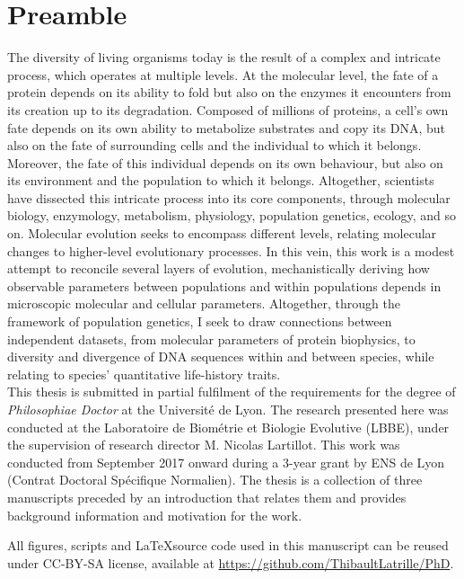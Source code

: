 \chapter*{Preamble}
The diversity of living organisms today is the result of a complex and intricate process, which operates at multiple levels.
At the molecular level, the fate of a protein depends on its ability to fold but also on the enzymes it encounters from its creation up to its degradation.
Composed of millions of proteins, a cell's own fate depends on its own ability to metabolize substrates and copy its \acrshort{DNA}, but also on the fate of surrounding cells and the individual to which it belongs.
Moreover, the fate of this individual depends on its own behaviour, but also on its environment and the population to which it belongs.
Altogether, scientists have dissected this intricate process into its core components, through molecular biology, enzymology, metabolism, physiology, population genetics, ecology, and so on.
Molecular evolution seeks to encompass different levels, relating molecular changes to higher-level evolutionary processes.
In this vein, this work is a modest attempt to reconcile several layers of evolution, mechanistically deriving how observable parameters between populations and within populations depends in microscopic molecular and cellular parameters.
Altogether, through the framework of population genetics, I seek to draw connections between independent datasets, from molecular parameters of protein biophysics, to diversity and divergence of \acrshort{DNA} sequences within and between species, while relating to species' quantitative life-history traits.\\

This thesis is submitted in partial fulfilment of the requirements for the degree of \emph{Philosophiae Doctor} at the Université de Lyon.
The research presented here was conducted at the Laboratoire de Biométrie et Biologie Evolutive (LBBE), under the supervision of research director M. Nicolas Lartillot.
This work was conducted from September 2017 onward during a 3-year grant by ENS de Lyon (Contrat Doctoral Spécifique Normalien).
The thesis is a collection of three manuscripts preceded by an introduction that relates them and provides background information and motivation for the work.

All figures, scripts and \LaTeX source code used in this manuscript can be reused under CC-BY-SA license, available at \url{https://github.com/ThibaultLatrille/PhD}.
